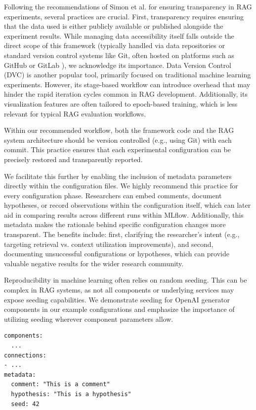 Following the recommendations of Simon et al. \cite{Simon.10112024} for ensuring transparency in RAG experiments, several practices are crucial. First, transparency requires ensuring that the data used is either publicly available or published alongside the experiment results. While managing data accessibility itself falls outside the direct scope of this framework (typically handled via data repositories or standard version control systems like Git, often hosted on platforms such as GitHub \cite{github-inc-2025} or GitLab \cite{gitlab-inc-2025}), we acknowledge its importance. Data Version Control (DVC) \cite{dvc.17.03.2025} is another popular tool, primarily focused on traditional machine learning experiments. However, its stage-based workflow can introduce overhead that may hinder the rapid iteration cycles common in RAG development. Additionally, its visualization features are often tailored to epoch-based training, which is less relevant for typical RAG evaluation workflows.

Within our recommended workflow, both the framework code and the RAG system architecture should be version controlled (e.g., using Git) with each commit. This practice ensures that each experimental configuration can be precisely restored and transparently reported.

We facilitate this further by enabling the inclusion of metadata parameters directly within the configuration files. We highly recommend this practice for every configuration phase. Researchers can embed comments, document hypotheses, or record observations within the configuration itself, which can later aid in comparing results across different runs within MLflow. Additionally, this metadata makes the rationale behind specific configuration changes more transparent. The benefits include: first, clarifying the researcher's intent (e.g., targeting retrieval vs. context utilization improvements), and second, documenting unsuccessful configurations or hypotheses, which can provide valuable negative results for the wider research community.

Reproducibility in machine learning often relies on random seeding. This can be complex in RAG systems, as not all components or underlying services may expose seeding capabilities. We demonstrate seeding for OpenAI generator components in our example configurations and emphasize the importance of utilizing seeding wherever component parameters allow.

\begin{verbatim}
components:
  ...
connections:
- ...
metadata: 
  comment: "This is a comment"
  hypothesis: "This is a hypothesis"
  seed: 42
\end{verbatim}

